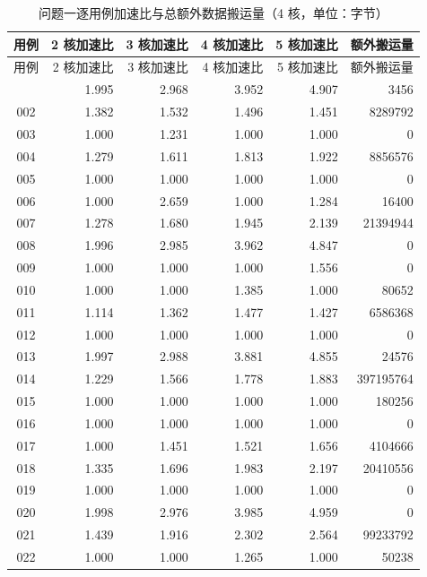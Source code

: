 \scriptsize
\setlength{\tabcolsep}{2.5pt}
\renewcommand{\arraystretch}{0.95}
\begin{longtable}{|c|r|r|r|r|r|}
\caption{问题一逐用例加速比与总额外数据搬运量（4 核，单位：字节）}\label{tab:q1_speedup}\\
\hline
用例 & 2 核加速比 & 3 核加速比 & 4 核加速比 & 5 核加速比 & 额外搬运量 \\
\hline
\endfirsthead
\hline
用例 & 2 核加速比 & 3 核加速比 & 4 核加速比 & 5 核加速比 & 额外搬运量 \\
\hline
\endhead
\hline
\endfoot
001 & 1.995 & 2.968 & 3.952 & 4.907 & 3456 \\
\hline
002 & 1.382 & 1.532 & 1.496 & 1.451 & 8289792 \\
\hline
003 & 1.000 & 1.231 & 1.000 & 1.000 & 0 \\
\hline
004 & 1.279 & 1.611 & 1.813 & 1.922 & 8856576 \\
\hline
005 & 1.000 & 1.000 & 1.000 & 1.000 & 0 \\
\hline
006 & 1.000 & 2.659 & 1.000 & 1.284 & 16400 \\
\hline
007 & 1.278 & 1.680 & 1.945 & 2.139 & 21394944 \\
\hline
008 & 1.996 & 2.985 & 3.962 & 4.847 & 0 \\
\hline
009 & 1.000 & 1.000 & 1.000 & 1.556 & 0 \\
\hline
010 & 1.000 & 1.000 & 1.385 & 1.000 & 80652 \\
\hline
011 & 1.114 & 1.362 & 1.477 & 1.427 & 6586368 \\
\hline
012 & 1.000 & 1.000 & 1.000 & 1.000 & 0 \\
\hline
013 & 1.997 & 2.988 & 3.881 & 4.855 & 24576 \\
\hline
014 & 1.229 & 1.566 & 1.778 & 1.883 & 397195764 \\
\hline
015 & 1.000 & 1.000 & 1.000 & 1.000 & 180256 \\
\hline
016 & 1.000 & 1.000 & 1.000 & 1.000 & 0 \\
\hline
017 & 1.000 & 1.451 & 1.521 & 1.656 & 4104666 \\
\hline
018 & 1.335 & 1.696 & 1.983 & 2.197 & 20410556 \\
\hline
019 & 1.000 & 1.000 & 1.000 & 1.000 & 0 \\
\hline
020 & 1.998 & 2.976 & 3.985 & 4.959 & 0 \\
\hline
021 & 1.439 & 1.916 & 2.302 & 2.564 & 99233792 \\
\hline
022 & 1.000 & 1.000 & 1.265 & 1.000 & 50238 \\

\end{longtable}
